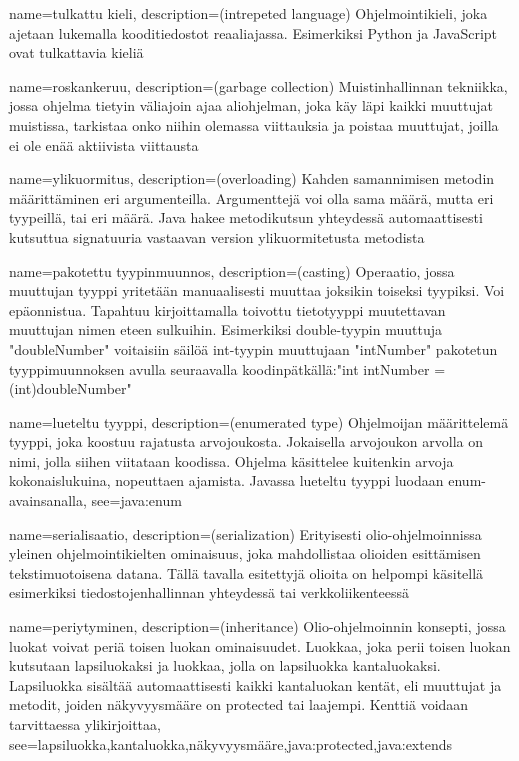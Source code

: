 {
	name=tulkattu kieli,
	description={(intrepeted language) Ohjelmointikieli, joka ajetaan lukemalla kooditiedostot
reaaliajassa. Esimerkiksi Python ja JavaScript ovat tulkattavia kieliä}
}

{
	name=roskankeruu,
	description={(garbage collection) Muistinhallinnan tekniikka, jossa ohjelma tietyin väliajoin
ajaa aliohjelman, joka käy läpi kaikki muuttujat muistissa, tarkistaa onko niihin olemassa
viittauksia ja poistaa muuttujat, joilla ei ole enää aktiivista viittausta}
}

{
	name=ylikuormitus,
	description={(overloading) Kahden samannimisen metodin määrittäminen eri argumenteilla.
Argumenttejä voi olla sama määrä, mutta eri tyypeillä, tai eri määrä. Java hakee metodikutsun
yhteydessä automaattisesti kutsuttua signatuuria vastaavan version ylikuormitetusta metodista}
}

{
	name=pakotettu tyypinmuunnos,
	description={(casting) Operaatio, jossa muuttujan tyyppi yritetään manuaalisesti muuttaa
joksikin toiseksi tyypiksi. Voi epäonnistua. Tapahtuu kirjoittamalla toivottu tietotyyppi
muutettavan muuttujan nimen eteen sulkuihin. Esimerkiksi double-tyypin muuttuja "doubleNumber"
voitaisiin säilöä int-tyypin muuttujaan "intNumber" pakotetun tyyppimuunnoksen avulla seuraavalla
koodinpätkällä:\newline{}"int intNumber = (int)doubleNumber"}
}

{
	name=lueteltu tyyppi,
	description={(enumerated type) Ohjelmoijan määrittelemä tyyppi, joka koostuu rajatusta
arvojoukosta. Jokaisella arvojoukon arvolla on nimi, jolla siihen viitataan koodissa. Ohjelma
käsittelee kuitenkin arvoja kokonaislukuina, nopeuttaen ajamista. Javassa lueteltu tyyppi luodaan
enum-avainsanalla},
	see={java:enum}
}

{
	name=serialisaatio,
	description={(serialization) Erityisesti olio-ohjelmoinnissa yleinen ohjelmointikielten
ominaisuus, joka mahdollistaa olioiden esittämisen tekstimuotoisena datana. Tällä tavalla
esitettyjä olioita on helpompi käsitellä esimerkiksi tiedostojenhallinnan yhteydessä tai
verkkoliikenteessä}
}

{
	name=periytyminen,
	description={(inheritance) Olio-ohjelmoinnin konsepti, jossa luokat voivat periä toisen luokan
ominaisuudet. Luokkaa, joka perii toisen luokan kutsutaan lapsiluokaksi ja luokkaa, jolla on
lapsiluokka kantaluokaksi. Lapsiluokka sisältää automaattisesti kaikki kantaluokan kentät, eli
muuttujat ja metodit, joiden näkyvyysmääre on protected tai laajempi. Kenttiä voidaan tarvittaessa
ylikirjoittaa},
	see={lapsiluokka,kantaluokka,näkyvyysmääre,java:protected,java:extends}
}

